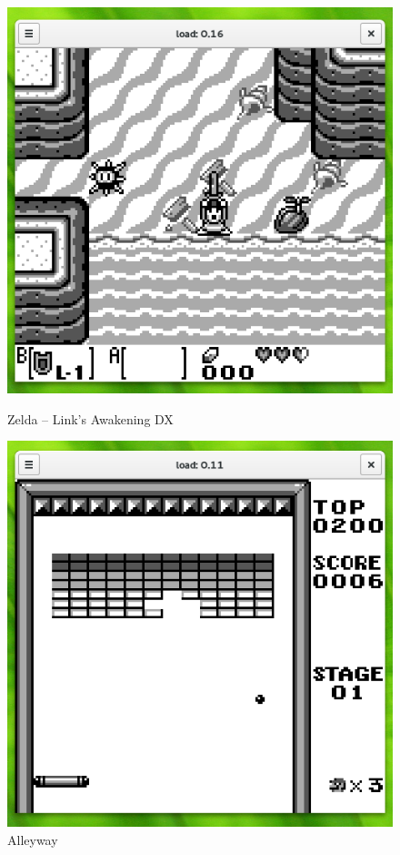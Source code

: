 \documentclass[a4paper]{scrartcl}
\begin{document}
\begin{figure}[H]
\centering
{}
  \includegraphics[width=\linewidth]{img/zelda}
  \captionsetup{labelformat=empty}
  \caption{Zelda -- Link's Awakening DX}
\endminipage\hspace{0.7cm}
  \includegraphics[width=\linewidth]{img/alleyway}
  \captionsetup{labelformat=empty}
  \caption{Alleyway}
\endminipage \vspace{0.5cm}


\end{figure}
\end{document}
